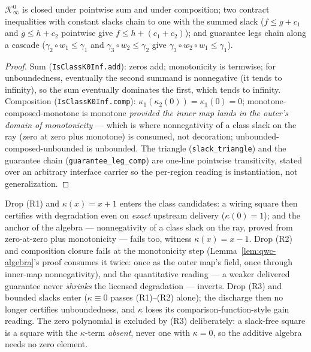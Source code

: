 \begin{blemma}\label{lem:qwc-algebra}
$\mathcal{K}^0_\infty$ is closed under pointwise sum and under
composition; two contract inequalities with constant slacks chain to
one with the summed slack
($f \leq g + c_1$ and $g \leq h + c_2$ pointwise give
$f \leq h + (c_1 + c_2)$); and guarantee legs chain along a cascade
($\gamma_2 \circ w_1 \leq \gamma_1$ and $\gamma_3 \circ w_2 \leq
\gamma_2$ give $\gamma_3 \circ w_2 \circ w_1 \leq \gamma_1$).
\end{blemma}
\begin{proof}
Sum (\texttt{IsClassK0Inf.add}): zeros add; monotonicity is termwise;
for unboundedness, eventually the second summand is nonnegative (it
tends to infinity), so the sum eventually dominates the first, which
tends to infinity. Composition (\texttt{IsClassK0Inf.comp}):
$\kappa_1(\kappa_2(0)) = \kappa_1(0) = 0$; monotone-composed-monotone
is monotone \emph{provided the inner map lands in the outer's domain
of monotonicity} --- which is where nonnegativity of a class slack on
the ray (zero at zero plus monotone) is consumed, not decoration;
unbounded-composed-unbounded is unbounded. The triangle
(\texttt{slack\_triangle}) and the guarantee chain
(\texttt{guarantee\_leg\_comp}) are one-line pointwise transitivity,
stated over an arbitrary interface carrier so the per-region reading
is instantiation, not generalization.
\end{proof}

\begin{bremark}
\label{rem:qwc-rows}
Drop (R1) and $\kappa(x) = x + 1$ enters the class candidates: a
wiring square then certifies with degradation even on \emph{exact}
upstream delivery ($\kappa(0) = 1$); and the anchor of the algebra ---
nonnegativity of a class slack on the ray, proved from zero-at-zero
plus monotonicity --- fails too, witness $\kappa(x) = x - 1$. Drop (R2) and composition
closure fails at the monotonicity step
(Lemma~\ref{lem:qwc-algebra}'s proof consumes it twice: once as the
outer map's field, once through inner-map nonnegativity), and the
quantitative reading --- a weaker delivered guarantee never
\emph{shrinks} the licensed degradation --- inverts. Drop (R3) and
bounded slacks enter ($\kappa \equiv 0$ passes (R1)--(R2) alone); the
discharge then no longer certifies unboundedness, and $\kappa$ loses
its comparison-function-style gain reading. The zero polynomial is excluded by (R3) deliberately: a
slack-free square is a square with the $\kappa$-term \emph{absent},
never one with $\kappa = 0$, so the additive algebra needs no zero
element.
\end{bremark}

